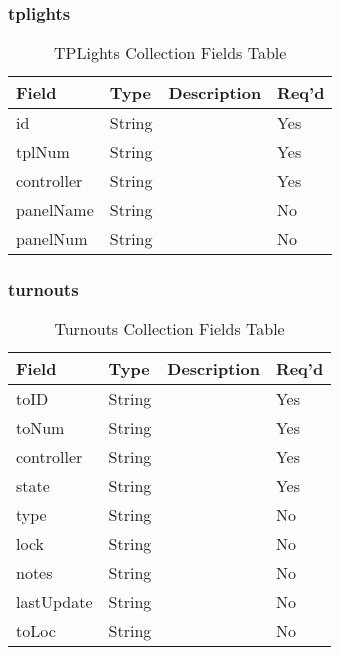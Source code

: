 \subsubsection{tplights}
\begin{table}[H]
    \begin{tabular}{|L{3cm}|L{1.7cm}|L{8.8cm}|L{1.3cm}|}
    \hline
        \textbf{Field} & \textbf{Type} & \textbf{Description} & \textbf{Req'd} \\ \hline
	id & String &  & Yes \\ \hline
	tplNum & String &  & Yes \\ \hline
	controller & String &  & Yes \\ \hline
	panelName & String &  & No \\ \hline
	panelNum & String &  & No \\ \hline
    \end{tabular}
    \caption{\label{tplight-table}TPLights Collection Fields Table}
    \end{table}

\subsubsection{turnouts}
\begin{table}[H]
    \begin{tabular}{|L{3cm}|L{1.7cm}|L{8.8cm}|L{1.3cm}|}
    \hline
        \textbf{Field} & \textbf{Type} & \textbf{Description} & \textbf{Req'd} \\ \hline
	toID & String &  & Yes \\ \hline	
	toNum & String &  & Yes \\ \hline	
	controller & String &  & Yes \\ \hline	
	state & String &  & Yes \\ \hline
	type & String &  & No \\ \hline	
	lock & String &  & No \\ \hline	
	notes & String &  & No \\ \hline	
	lastUpdate & String &  & No \\ \hline	
	toLoc & String &  & No \\ \hline
    \end{tabular}
    \caption{\label{turnout-table}Turnouts Collection Fields Table}
    \end{table}




